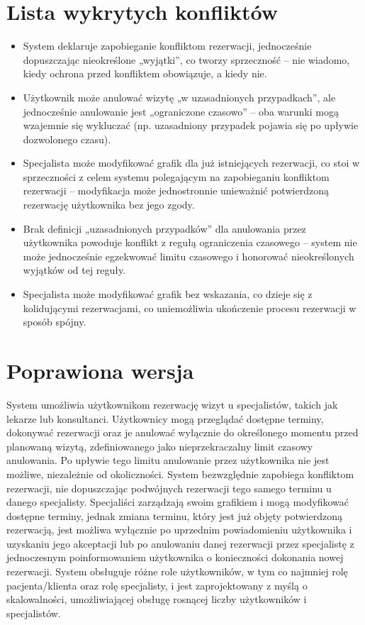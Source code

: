 \documentclass[12pt,a4paper]{article}
\begin{document}
\section{Lista wykrytych konfliktów}

\begin{itemize}[leftmargin=1.5em, label={-}]
  \item System deklaruje zapobieganie konfliktom rezerwacji, jednocześnie dopuszczając nieokreślone „wyjątki”, co tworzy sprzeczność – nie wiadomo, kiedy ochrona przed konfliktem obowiązuje, a kiedy nie.
  \item Użytkownik może anulować wizytę „w uzasadnionych przypadkach”, ale jednocześnie anulowanie jest „ograniczone czasowo” – oba warunki mogą wzajemnie się wykluczać (np. uzasadniony przypadek pojawia się po upływie dozwolonego czasu).
  \item Specjalista może modyfikować grafik dla już istniejących rezerwacji, co stoi w sprzeczności z celem systemu polegającym na zapobieganiu konfliktom rezerwacji – modyfikacja może jednostronnie unieważnić potwierdzoną rezerwację użytkownika bez jego zgody.
  \item Brak definicji „uzasadnionych przypadków” dla anulowania przez użytkownika powoduje konflikt z regułą ograniczenia czasowego – system nie może jednocześnie egzekwować limitu czasowego i honorować nieokreślonych wyjątków od tej reguły.
  \item Specjalista może modyfikować grafik bez wskazania, co dzieje się z kolidującymi rezerwacjami, co uniemożliwia ukończenie procesu rezerwacji w sposób spójny.
\end{itemize}

\section{Poprawiona wersja}

System umożliwia użytkownikom rezerwację wizyt u specjalistów, takich jak lekarze lub konsultanci. Użytkownicy mogą przeglądać dostępne terminy, dokonywać rezerwacji oraz je anulować wyłącznie do określonego momentu przed planowaną wizytą, zdefiniowanego jako nieprzekraczalny limit czasowy anulowania. Po upływie tego limitu anulowanie przez użytkownika nie jest możliwe, niezależnie od okoliczności. System bezwzględnie zapobiega konfliktom rezerwacji, nie dopuszczając podwójnych rezerwacji tego samego terminu u danego specjalisty. Specjaliści zarządzają swoim grafikiem i mogą modyfikować dostępne terminy, jednak zmiana terminu, który jest już objęty potwierdzoną rezerwacją, jest możliwa wyłącznie po uprzednim powiadomieniu użytkownika i uzyskaniu jego akceptacji lub po anulowaniu danej rezerwacji przez specjalistę z jednoczesnym poinformowaniem użytkownika o konieczności dokonania nowej rezerwacji. System obsługuje różne role użytkowników, w tym co najmniej rolę pacjenta/klienta oraz rolę specjalisty, i jest zaprojektowany z myślą o skalowalności, umożliwiającej obsługę rosnącej liczby użytkowników i specjalistów.
\end{document}

